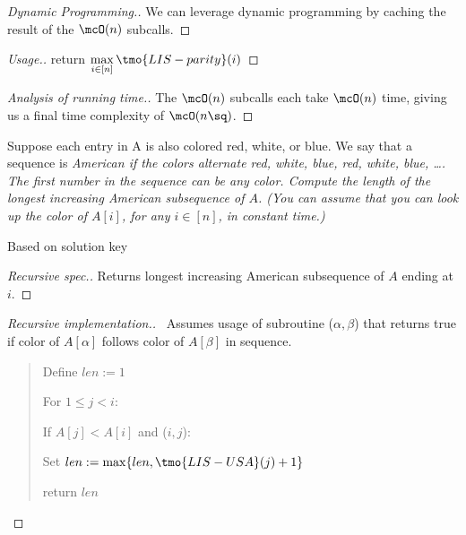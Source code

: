 \documentclass{article}
\begin{document}
\begin{proof}[Dynamic Programming.]
  We can leverage dynamic programming by caching the result of the \( \mcO(n) \) subcalls.
\end{proof}

\begin{proof}[Usage.]
  return \( \max\limits_{i\in[n]} \tmo{LIS-parity}(i) \)
\end{proof}

\begin{proof}[Analysis of running time.]
  The \( \mcO(n) \) subcalls each take \( \mcO(n) \) time, giving us a final time complexity of \( \mcO(n\sq) \).
\end{proof}
\pagebreak

\begin{subexercise}
  Suppose each entry in A is also colored red, white, or blue. We say that a sequence is \it{American} if the colors alternate red, white, blue, red, white, blue, \ldots.  The first number in the sequence can be any color. Compute the length of the longest increasing American subsequence of \( A \). (You can assume that you can look up the color of \( A[i] \), for any \( i \in [n] \), in constant time.)
\end{subexercise}

\begin{note}
  Based on solution key
\end{note}

\begin{proof}[Recursive spec.]
  Returns longest increasing American subsequence of \( A \) ending at \( i \).
\end{proof}

\begin{proof}[Recursive implementation.]\
Assumes usage of subroutine (\( \alpha,\beta \)) that returns true if color of \( A[\alpha] \) follows color of \( A[\beta] \) in sequence.
\begin{quote}
\begin{steps}
  \item Define \( len := 1 \)
  \item For \( 1\leq j < i \): \begin{steps}
    \item If \( A[j] < A[i] \) and (\( i,j \)): \begin{steps}
      \item Set \( len := \max\{len, \tmo{LIS-USA}(j)+1\} \)
    \end{steps}
  \end{steps}
  \item return \( len \)
\end{steps}
\end{quote}
\end{proof}
\end{document}
